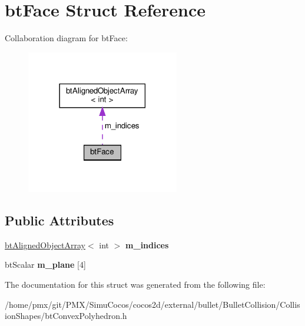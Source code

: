 \hypertarget{structbtFace}{}\section{bt\+Face Struct Reference}
\label{structbtFace}


Collaboration diagram for bt\+Face\+:
\nopagebreak
\begin{figure}[H]
\begin{center}
\leavevmode
\includegraphics[width=189pt]{structbtFace__coll__graph}
\end{center}
\end{figure}
\subsection*{Public Attributes}
\begin{DoxyCompactItemize}
\item 
\mbox{\label{structbtFace_a679c2b62be133e289d5fba2e661bdd63}} 
\hyperlink{classbtAlignedObjectArray}{bt\+Aligned\+Object\+Array}$<$ int $>$ {\bfseries m\+\_\+indices}
\item 
\mbox{\label{structbtFace_aefd2c31b3294b9e43ca4358a19f02cdf}} 
bt\+Scalar {\bfseries m\+\_\+plane} \mbox{[}4\mbox{]}
\end{DoxyCompactItemize}


The documentation for this struct was generated from the following file\+:\begin{DoxyCompactItemize}
\item 
/home/pmx/git/\+P\+M\+X/\+Simu\+Cocos/cocos2d/external/bullet/\+Bullet\+Collision/\+Collision\+Shapes/bt\+Convex\+Polyhedron.\+h\end{DoxyCompactItemize}
